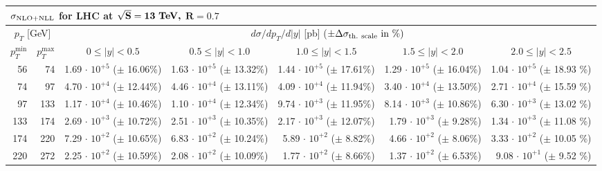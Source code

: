 
\begin{table}[h!]
\renewcommand{\arraystretch}{1.3}
\begin{center}
\begin{tabular}{|r|r|r|r|r|r|r|}
  \hline
  \multicolumn{7}{l}{$\mathbf{\sigma_{\rm NLO + NLL}}$ \bf{for LHC at} $\mathbf{\sqrt{S}=13~\mbox{\bf TeV,}}$ $\mathbf{R=0.7}$}\\ 
  \hline
  \hline
\multicolumn{2}{|c|}{$p_T$ [GeV]} &
\multicolumn{5}{|c|}{$d\sigma/dp_T/d|y|$ [pb] \quad ($\pm \Delta \sigma_{\rm th.~scale}~\mbox{in}~\%) $} \\
\multicolumn{1}{|c|}{$p_T^{\min}$} &
\multicolumn{1}{|c|}{$p_T^{\max}$} &
\multicolumn{1}{|c|}{$0 \le |y| < 0.5$} &
\multicolumn{1}{|c|}{$0.5 \le |y| < 1.0$} &
\multicolumn{1}{|c|}{$1.0 \le |y| < 1.5$} &
\multicolumn{1}{|c|}{$1.5 \le |y| < 2.0$} &
\multicolumn{1}{|c|}{$2.0 \le |y| < 2.5$} \\
\hline
%
  56 &   74 & 1.69$\,\cdot\, 10^{+5}$  ($\pm\!\!$ 16.06\%) & 1.63$\,\cdot\, 10^{+5}$  ($\pm\!\!$ 13.32\%) & 1.44$\,\cdot\, 10^{+5}$  ($\pm\!\!$ 17.61\%) & 1.29$\,\cdot\, 10^{+5}$  ($\pm\!\!$ 16.04\%) & 1.04$\,\cdot\, 10^{+5}$  ($\pm\!\!$ 18.93 \%)\\
  74 &   97 & 4.70$\,\cdot\, 10^{+4}$  ($\pm\!\!$ 12.44\%) & 4.46$\,\cdot\, 10^{+4}$  ($\pm\!\!$ 13.11\%) & 4.09$\,\cdot\, 10^{+4}$  ($\pm\!\!$ 11.94\%) & 3.40$\,\cdot\, 10^{+4}$  ($\pm\!\!$ 13.50\%) & 2.71$\,\cdot\, 10^{+4}$  ($\pm\!\!$ 15.59 \%)\\
  97 &  133 & 1.17$\,\cdot\, 10^{+4}$  ($\pm\!\!$ 10.46\%) & 1.10$\,\cdot\, 10^{+4}$  ($\pm\!\!$ 12.34\%) & 9.74$\,\cdot\, 10^{+3}$  ($\pm\!\!$ 11.95\%) & 8.14$\,\cdot\, 10^{+3}$  ($\pm\!\!$ 10.86\%) & 6.30$\,\cdot\, 10^{+3}$  ($\pm\!\!$ 13.02 \%)\\
 133 &  174 & 2.69$\,\cdot\, 10^{+3}$  ($\pm\!\!$ 10.72\%) & 2.51$\,\cdot\, 10^{+3}$  ($\pm\!\!$ 10.35\%) & 2.17$\,\cdot\, 10^{+3}$  ($\pm\!\!$ 12.07\%) & 1.79$\,\cdot\, 10^{+3}$  ($\pm\!\!$  9.28\%) & 1.34$\,\cdot\, 10^{+3}$  ($\pm\!\!$ 11.08 \%)\\
 174 &  220 & 7.29$\,\cdot\, 10^{+2}$  ($\pm\!\!$ 10.65\%) & 6.83$\,\cdot\, 10^{+2}$  ($\pm\!\!$ 10.24\%) & 5.89$\,\cdot\, 10^{+2}$  ($\pm\!\!$  8.82\%) & 4.66$\,\cdot\, 10^{+2}$  ($\pm\!\!$  8.06\%) & 3.33$\,\cdot\, 10^{+2}$  ($\pm\!\!$ 10.05 \%)\\
 220 &  272 & 2.25$\,\cdot\, 10^{+2}$  ($\pm\!\!$ 10.59\%) & 2.08$\,\cdot\, 10^{+2}$  ($\pm\!\!$ 10.09\%) & 1.77$\,\cdot\, 10^{+2}$  ($\pm\!\!$  8.66\%) & 1.37$\,\cdot\, 10^{+2}$  ($\pm\!\!$  6.53\%) & 9.08$\,\cdot\, 10^{+1}$  ($\pm\!\!$  9.52 \%)\\

\end{tabular}
\end{center}
\end{table}
